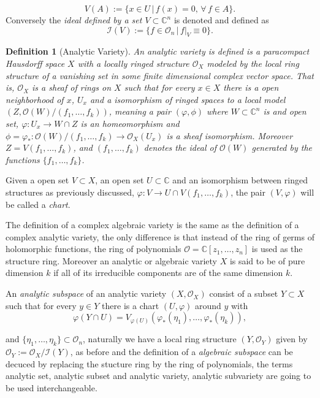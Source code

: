 \documentclass[12pt,twoside,a4paper]{report}
\newtheorem{definition}{Definition}[section]
\newcommand{\co}{\ensuremath{\mathbb C }}
\newcommand{\con}{\ensuremath{\mathbb{C}^n}}
\newcommand{\osheaf}{\ensuremath{\mathcal O }}
\begin{document}
\[
  V(A):=\{x\in U\,\vert\,f(x)=0,\,\forall\,f\in A\}.
\]
\noindent Conversely the \emph{ideal defined by a set $V\subset\con$} is denoted and defined as
\[
  \mathcal{I}(V):=\{f\in\osheaf_{n}\,|\,f|_{V}\equiv0\}.
\]
\begin{definition}[Analytic Variety]
  An \emph{analytic variety} is defined is a paracompact Hausdorff space $X$ with a locally ringed structure $\osheaf_{X}$ modeled by the local ring structure of a vanishing set in some finite dimensional complex vector space. That is, $\osheaf_{X}$ is a sheaf of rings on $X$ such that for every $x\in X$ there is a open neighborhood of $x$, $U_{x}$ and a isomorphism of ringed spaces to a local model $(Z,\osheaf(W)/(f_{1},\dots,f_{k}))$, meaning a pair $(\varphi,\phi)$ where $W\subset\con$ is and open set, $\varphi:U_{x}\rightarrow W\cap Z$ is an homeomorphism and $\phi=\varphi_{*}:\osheaf(W)/(f_{1},\dots,f_{k})\rightarrow\osheaf_{X}(U_{x})$ is a sheaf isomorphism. Moreover $Z=V(f_{1},\dots,f_{k})$, and $(f_{1},\dots,f_{k})$ denotes the ideal of $\osheaf(W)$ generated by the functions $\{f_{1},\dots,f_{k}\}$.
\end{definition}
\noindent Given a open set $V\subset X$, an open set $U\subset\co$ and an isomorphism between ringed structures as previously discussed, $\varphi:V\rightarrow U\cap V(f_{1},\dots,f_{k})$, the pair $(V,\varphi)$ will be called a \emph{chart}.

The definition of a complex algebraic variety is the same as the definition of a complex analytic variety, the only difference is that instead of the ring of germs of holomorphic functions, the ring of polynomials $\osheaf=\co[z_{1},\dots,z_{n}]$ is used as the structure ring. Moreover an analytic or algebraic variety $X$ is said to be of pure dimension $k$ if all of its irreducible components are of the same dimension $k$.

An \emph{analytic subspace} of an analytic variety $(X,\osheaf_{X})$ consist of a subset $Y\subset X$ such that for every $y\in Y$ there is a chart $(U,\varphi)$ around $y$ with
\[
  \varphi(Y\cap U)=V_{\varphi(U)}(\varphi_{*}(\eta_1),\dots,\varphi_{*}(\eta_k)),
\]

\noindent and $\lbrace\eta_1,\dots,\eta_k\rbrace\subset\osheaf_{n}$, naturally we have a local ring structure $(Y,\osheaf_{Y})$ given by $\osheaf_Y:=\osheaf_{X}/\mathcal{I}(Y)$, as before and the definition of a \emph{algebraic subspace} can be decuced by replacing the stucture ring by the ring of polynomials, the terms analytic set, analytic subset and analytic variety, analytic subvariety are going to be used interchangeable.
\end{document}
